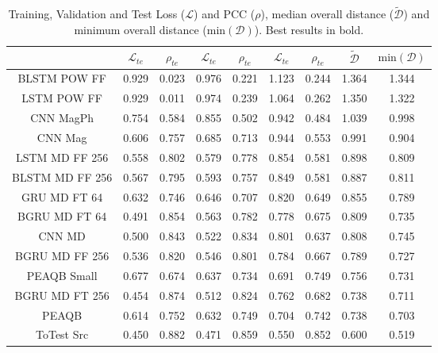 \begin{table*}[ht]
\caption{Training, Validation and Test Loss ($\mathcal{L}$) and PCC ($\rho$), median overall distance ($\widetilde{\mathcal{D}}$) and minimum overall distance ($\text{min}(\mathcal{D})$).  Best results in bold.}
\centering
\begin{ruledtabular}
\begin{tabular}{ccccccccc}
 & $\mathcal{L}_{te}$ & $\rho_{te}$ & $\mathcal{L}_{te}$ & $\rho_{te}$ & $\mathcal{L}_{te}$ & $\rho_{te}$ & $\widetilde{\mathcal{D}}$ & $\text{min}(\mathcal{D})$ \\
\hline
BLSTM POW FF & 0.929 & 0.023 & 0.976 & 0.221 & 1.123 & 0.244 & 1.364 & 1.344 \\
\hline
LSTM POW FF & 0.929 & 0.011 & 0.974 & 0.239 & 1.064 & 0.262 & 1.350 & 1.322 \\
\hline
CNN MagPh & 0.754 & 0.584 & 0.855 & 0.502 & 0.942 & 0.484 & 1.039 & 0.998 \\
\hline
CNN Mag & 0.606 & 0.757 & 0.685 & 0.713 & 0.944 & 0.553 & 0.991 & 0.904 \\
\hline
LSTM MD FF 256 & 0.558 & 0.802 & 0.579 & 0.778 & 0.854 & 0.581 & 0.898 & 0.809 \\
\hline
BLSTM MD FF 256 & 0.567 & 0.795 & 0.593 & 0.757 & 0.849 & 0.581 & 0.887 & 0.811 \\
\hline
GRU MD FT 64 & 0.632 & 0.746 & 0.646 & 0.707 & 0.820 & 0.649 & 0.855 & 0.789 \\
\hline
BGRU MD FT 64 & 0.491 & 0.854 & 0.563 & 0.782 & 0.778 & 0.675 & 0.809 & 0.735 \\
\hline
CNN MD & 0.500 & 0.843 & 0.522 & 0.834 & 0.801 & 0.637 & 0.808 & 0.745 \\
\hline
BGRU MD FF 256 & 0.536 & 0.820 & 0.546 & 0.801 & 0.784 & 0.667 & 0.789 & 0.727 \\
\hline
PEAQB Small & 0.677 & 0.674 & 0.637 & 0.734 & 0.691 & 0.749 & 0.756 & 0.731 \\
\hline
BGRU MD FT 256 & 0.454 & 0.874 & 0.512 & 0.824 & 0.762 & 0.682 & 0.738 & 0.711 \\
\hline
PEAQB & 0.614 & 0.752 & 0.632 & 0.749 & 0.704 & 0.742 & 0.738 & 0.703 \\
\hline
ToTest Src & 0.450 & 0.882 & 0.471 & 0.859 & 0.550 & 0.852 & 0.600 & 0.519 \\
\end{tabular}
\end{ruledtabular}
\label{tab:RMSE_PCC}
\end{table*}
